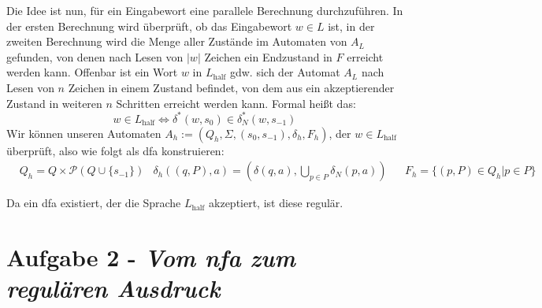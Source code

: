 \documentclass{article}
\begin{document}
Die Idee ist nun, für ein Eingabewort eine parallele Berechnung durchzuführen. In der ersten Berechnung wird überprüft, ob das Eingabewort $w \in L$ ist, in der zweiten Berechnung wird die Menge aller Zustände im Automaten von $A_L$ gefunden, von denen nach Lesen von $|w|$ Zeichen ein Endzustand in $F$ erreicht werden kann. Offenbar ist ein Wort $w$ in $L_\text{half}$ gdw. sich der Automat $A_L$ nach Lesen von $n$ Zeichen in einem Zustand befindet, von dem aus ein akzeptierender Zustand in weiteren $n$ Schritten erreicht werden kann. Formal heißt das:
\begin{equation}
	w\in L_\text{half} \Leftrightarrow \delta^*(w,s_0) \in \delta_N^*(w,s_{-1})
\end{equation}
Wir können unseren Automaten $A_h := (Q_h,\Sigma,(s_0,s_{-1}),\delta_h, F_h)$, der $w \in L_\text{half}$ überprüft, also wie folgt als dfa konstruieren:
\begin{align}
	&Q_h = Q \times \mathcal{P}(Q \cup \{s_{-1}\}) &\delta_h((q,P),a) = (\delta(q,a),\bigcup_{p \in P} \delta_N(p,a)) &&F_h = \{ (p,P) \in Q_h | p \in P\}
\end{align}

Da ein dfa existiert, der die Sprache $L_\text{half}$ akzeptiert, ist diese regulär.

\section*{Aufgabe 2 - \textit{Vom nfa zum regulären Ausdruck}}
\end{document}
